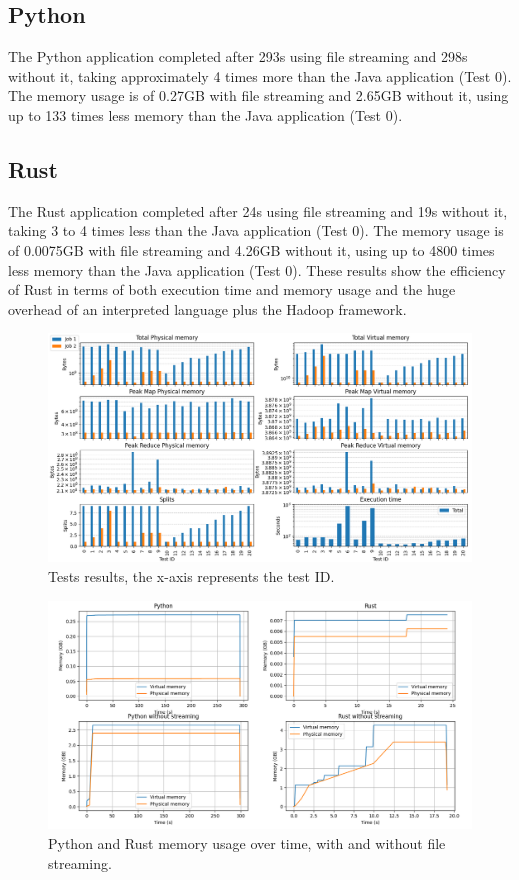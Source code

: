 \documentclass{article}
\begin{document}
\begin{multicols}{2}
    \subsection{Python}
        The Python application completed after 293s using file streaming and 298s without it, 
        taking approximately 4 times more than the Java application (Test 0).
        The memory usage is of 0.27GB with file streaming and 2.65GB without it, using up to 
        133 times less memory than the Java application (Test 0).
    \subsection{Rust}
        The Rust application completed after 24s using file streaming and 19s without it, taking
        3 to 4 times less than the Java application (Test 0).
        The memory usage is of 0.0075GB with file streaming and 4.26GB without it, using up to
        4800 times less memory than the Java application (Test 0).
        These results show the efficiency of Rust in terms of both execution time and memory usage and
        the huge overhead of an interpreted language plus the Hadoop framework.

\end{multicols}
\begin{figure}[H]
    \centering
    \includegraphics[width=1\textwidth]{figures/experiments.png}
    \caption{Tests results, the x-axis represents the test ID.}
    \label{fig:tests_graph}
\end{figure}
\begin{figure}[H]
    \centering
    \includegraphics[width=1\textwidth]{figures/baseline.png}
    \caption{Python and Rust memory usage over time, with and without file streaming.}
    \label{fig:baseline}
\end{figure}
\end{document}
